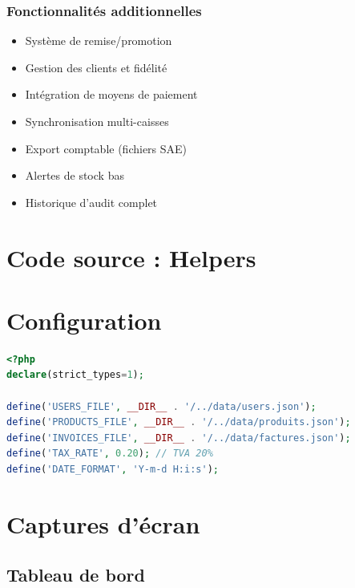 \documentclass[12pt,a4paper,french]{report}
\begin{document}
\subsection{Fonctionnalités additionnelles}

\begin{itemize}
    \item Système de remise/promotion
    \item Gestion des clients et fidélité
    \item Intégration de moyens de paiement
    \item Synchronisation multi-caisses
    \item Export comptable (fichiers SAE)
    \item Alertes de stock bas
    \item Historique d'audit complet
\end{itemize}


\appendix

\chapter{Code source : Helpers}



\chapter{Configuration}

\begin{lstlisting}[language=PHP, caption=Fichier de configuration]
<?php
declare(strict_types=1);

define('USERS_FILE', __DIR__ . '/../data/users.json');
define('PRODUCTS_FILE', __DIR__ . '/../data/produits.json');
define('INVOICES_FILE', __DIR__ . '/../data/factures.json');
define('TAX_RATE', 0.20); // TVA 20%
define('DATE_FORMAT', 'Y-m-d H:i:s');
\end{lstlisting}

\chapter{Captures d'écran}

\section{Tableau de bord}
\end{document}

